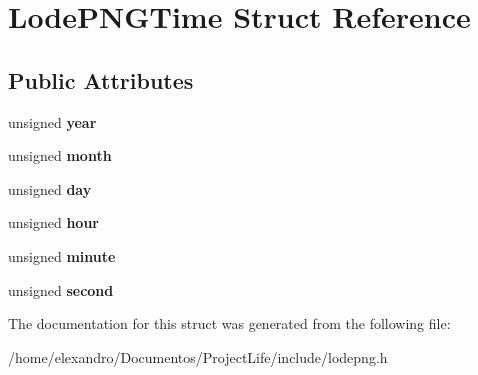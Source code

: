 \section{Lode\+P\+N\+G\+Time Struct Reference}
\label{struct_lode_p_n_g_time}
\subsection*{Public Attributes}
\begin{DoxyCompactItemize}
\item 
\mbox{\label{struct_lode_p_n_g_time_a32b68342f39f3d38ba91a721b1149b8f}} 
unsigned {\bfseries year}
\item 
\mbox{\label{struct_lode_p_n_g_time_a295d890e862d5cd0c444e9d3a96fa9d5}} 
unsigned {\bfseries month}
\item 
\mbox{\label{struct_lode_p_n_g_time_aa3dee3b7b3a1e730fbded7a7b8cf355e}} 
unsigned {\bfseries day}
\item 
\mbox{\label{struct_lode_p_n_g_time_ac99cb7f3ce16a85f9f505b7f5f6e0aa7}} 
unsigned {\bfseries hour}
\item 
\mbox{\label{struct_lode_p_n_g_time_ac3045de79728f29fc61f534b062e0f13}} 
unsigned {\bfseries minute}
\item 
\mbox{\label{struct_lode_p_n_g_time_a6c691c5821e828488a8bb8a90751a2f0}} 
unsigned {\bfseries second}
\end{DoxyCompactItemize}


The documentation for this struct was generated from the following file\+:\begin{DoxyCompactItemize}
\item 
/home/elexandro/\+Documentos/\+Project\+Life/include/lodepng.\+h\end{DoxyCompactItemize}
